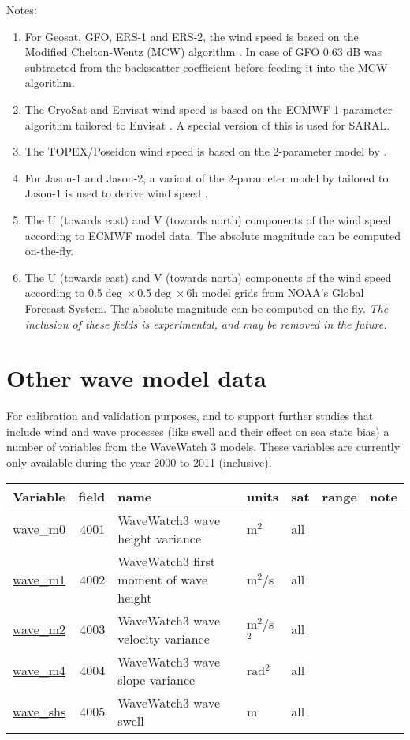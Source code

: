 \documentclass[a4paper,11pt,openany,natbib]{thesis}
\makeatletter
\newcommand\var[1]{\url{#1}\index{variables!#1@\protect\url{#1}}}
\newenvironment{vartable}{
\begin{table}[ht]
\small
\begin{tabular}{lrllllr}
\hline
Variable & field & name & units & sat & range & note \\
\hline
}{
\hline
\end{tabular}
\end{table}
}
\makeatother
\begin{document}
Notes:
\begin{enumerate}
\item For Geosat, GFO, ERS-1 and ERS-2, the wind speed is based on the Modified Chelton-Wentz (MCW) algorithm \citep{witter1991}. In case of GFO 0.63 dB was subtracted from the backscatter coefficient before feeding it into the MCW algorithm.\label{item:wind_speed_mcw}
\item The CryoSat and Envisat wind speed is based on the ECMWF 1-parameter algorithm tailored to Envisat \citep{abdalla2007}. A special version of this is used for SARAL.\label{item:wind_speed_abdalla}
\item The TOPEX/Poseidon wind speed is based on the 2-parameter model by \citet{gourrion2002b}.\label{item:wind_speed_topex}
\item For Jason-1 and Jason-2, a variant of the 2-parameter model by \citet{gourrion2002b} tailored to Jason-1 is used to derive wind speed \citep{collard2005}.\label{item:wind_speed_jason}
\item The U (towards east) and V (towards north) components of the wind speed according to ECMWF model data. The absolute magnitude can be computed on-the-fly.\label{item:wind_speed_ecmwf}
\item The U (towards east) and V (towards north) components of the wind speed according to 0.5$\deg\times$0.5$\deg\times$6h model grids from NOAA's Global Forecast System. The absolute magnitude can be computed on-the-fly. \emph{The inclusion of these fields is experimental, and may be removed in the future.}\label{item:wind_speed_gfs}
\end{enumerate}

\section{Other wave model data}
For calibration and validation purposes, and to support further studies that include wind and wave processes (like swell and their effect on sea state bias) a number of variables from the WaveWatch 3 models. These variables are currently only available during the year 2000 to 2011 (inclusive).

\begin{vartable}
\var{wave_m0} & 4001 & WaveWatch3 wave height variance & m$^2$ & all & & \\
\var{wave_m1} & 4002 & WaveWatch3 first moment of wave height & m$^2$/s & all & & \\
\var{wave_m2} & 4003 & WaveWatch3 wave velocity variance & m$^2$/s$^2$ & all & & \\ 
\var{wave_m4} & 4004 & WaveWatch3 wave slope variance & rad$^2$ & all & & \\ 
\var{wave_shs} & 4005 & WaveWatch3 wave swell & m & all & & \\ 
\end{vartable}
\end{document}
